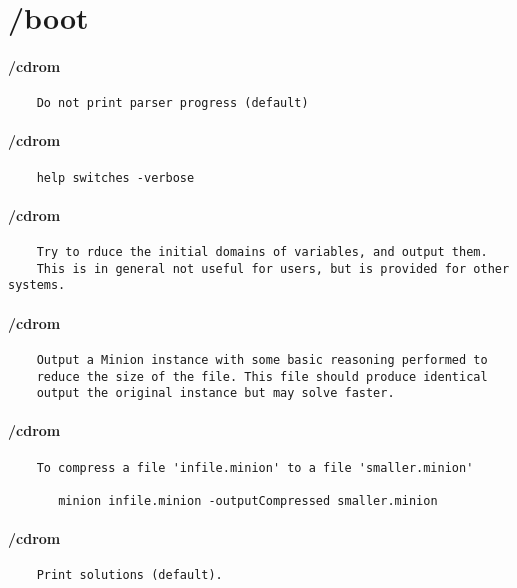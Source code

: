 \section{/boot}
\paragraph{/cdrom}
{\footnotesize
\begin{verbatim}
    Do not print parser progress (default)
\end{verbatim}
}
\paragraph{/cdrom}
{\footnotesize
\begin{verbatim}
    help switches -verbose
\end{verbatim}
}
\paragraph{/cdrom}
{\footnotesize
\begin{verbatim}
    Try to rduce the initial domains of variables, and output them.
    This is in general not useful for users, but is provided for other systems.
\end{verbatim}
}
\paragraph{/cdrom}
{\footnotesize
\begin{verbatim}
    Output a Minion instance with some basic reasoning performed to
    reduce the size of the file. This file should produce identical
    output the original instance but may solve faster.
\end{verbatim}
}
\paragraph{/cdrom}
{\footnotesize
\begin{verbatim}
    To compress a file 'infile.minion' to a file 'smaller.minion'

       minion infile.minion -outputCompressed smaller.minion
\end{verbatim}
}
\paragraph{/cdrom}
{\footnotesize
\begin{verbatim}
    Print solutions (default).
\end{verbatim}
}
